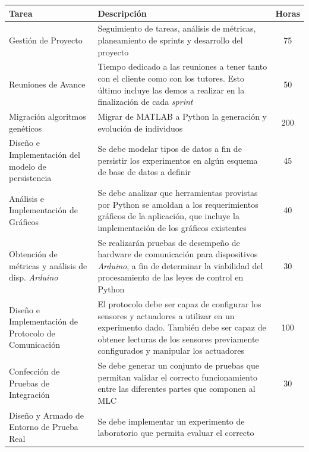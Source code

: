 \documentclass[a4paper,10pt]{article}
\begin{document}
        \begin{center}
        \hspace*{-1.5cm}
        \begin{longtable}{|p{3.5cm}|p{7cm}|c|}
            \hline
            \textbf{Tarea} & \textbf{Descripción} & \textbf{Horas} \\
            \hline
            Gestión de Proyecto & Seguimiento de tareas, análisis de métricas, planeamiento de sprints y
            desarrollo del proyecto & 75 \\
            \hline
            Reuniones de Avance & Tiempo dedicado a las reuniones a tener tanto con el cliente como con los tutores. Esto último incluye
            las demos a realizar en la finalización de cada \textit{sprint} & 50 \\
            \hline
            Migración algoritmos genéticos & Migrar de MATLAB a Python la generación y evolución de individuos & 200 \\
            \hline
            Diseño e Implementación del modelo de persistencia & Se debe modelar tipos de datos a fin de persistir los experimentos
            en algún esquema de base de datos a definir & 45 \\
            \hline
            Análisis e Implementación de Gráficos & Se debe analizar que herramientas provistas por Python se amoldan a los requerimientos
            gráficos de la aplicación, que incluye la implementación de los gráficos existentes & 40 \\
            \hline
            Obtención de métricas y análisis de disp. \textit{Arduino} & Se realizarán pruebas de desempeño de hardware de comunicación
            para dispositivos \textit{Arduino}, a fin de determinar la viabilidad del procesamiento de las leyes de control en Python
            & 30 \\
            \hline
            Diseño e Implementación de Protocolo de Comunicación & El protocolo debe ser capaz de configurar los sensores y actuadores
            a utilizar en un experimento dado. También debe ser capaz de obtener lecturas de los sensores previamente configurados y
            manipular los actuadores & 100 \\
            \hline
            Confección de Pruebas de Integración & Se debe generar un conjunto de pruebas que permitan validar el correcto funcionamiento
            entre las diferentes partes que componen al MLC & 30 \\
            \hline
            Diseño y Armado de Entorno de Prueba Real & Se debe implementar un experimento de laboratorio que permita evaluar el correcto

\end{longtable}
\end{center}
\end{document}
